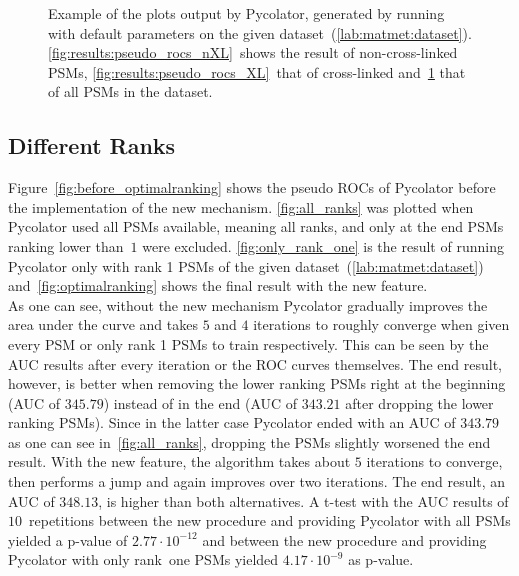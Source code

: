 \begin{figure}
\begin{subfigure}{0.49\textwidth}
		\caption{}
		\label{fig:results:pseudo_rocs_all}
	\end{subfigure}
	\caption[Examples for pseudo ROC curves as produced by Pycolator]{Example of the plots output by Pycolator, generated by running with default parameters on the given dataset~(\ref{lab:matmet:dataset}). \ref{fig:results:pseudo_rocs_nXL}~shows the result of non-cross-linked PSMs, \ref{fig:results:pseudo_rocs_XL}~that of cross-linked and~\ref{fig:results:pseudo_rocs_all} that of all PSMs in the dataset.}
	\label{fig:results:pseudo_rocs}
\end{figure}
\renewcommand{\baselinestretch}{1}

\subsection{Different Ranks}
\label{lab:results:ranks}
Figure~\ref{fig:before_optimalranking} shows the pseudo ROCs of Pycolator before the implementation of the new mechanism. \ref{fig:all_ranks} was plotted when Pycolator used all PSMs available, meaning all ranks, and only at the end PSMs ranking lower than~$1$ were excluded. \ref{fig:only_rank_one} is the result of running Pycolator only with rank 1 PSMs of the given dataset~(\ref{lab:matmet:dataset}) and~\ref{fig:optimalranking} shows the final result with the new feature.\\
As one can see, without the new mechanism Pycolator gradually improves the area under the curve and takes $5$ and $4$ iterations to roughly converge when given every PSM or only rank 1 PSMs to train respectively. This can be seen by the AUC results after every iteration or the ROC curves themselves. The end result, however, is better when removing the lower ranking PSMs right at the beginning (AUC of $345.79$) instead of in the end (AUC of $343.21$ after dropping the lower ranking PSMs). Since in the latter case Pycolator ended with an AUC of $343.79$ as one can see in~\ref{fig:all_ranks}, dropping the PSMs slightly worsened the end result. With the new feature, the algorithm takes about $5$ iterations to converge, then performs a jump and again improves over two iterations. The end result, an AUC of $348.13$, is higher than both alternatives. A t-test with the AUC results of $10$~repetitions between the new procedure and providing Pycolator with all PSMs yielded a p-value of $2.77\cdot10^{-12}$ and between the new procedure and providing Pycolator with only rank~one PSMs yielded $4.17\cdot10^{-9}$ as p-value.
\renewcommand{\baselinestretch}{0.9}
